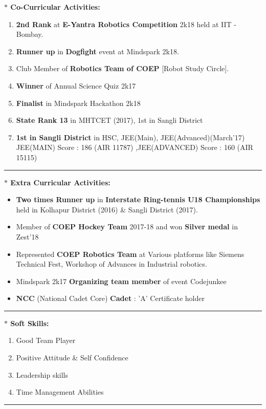 \documentclass[a4paper,11pt]{article} %
\begin{document}
			\begin{LARGE}
				\textbf{\large $\ast$ Co-Curricular Activities:}\smallskip%
				{\small
					\begin{enumerate}%
						\item \textbf{2nd Rank } at \textbf{E-Yantra Robotics Competition} 2k18 held at IIT - Bombay.
						\item \textbf{Runner up} in \textbf{Dogfight} event at Mindspark 2k18.
						\item Club Member of \textbf{Robotics Team of COEP} [Robot Study Circle].
						\item \textbf{Winner} of Annual Science Quiz 2k17
						\item \textbf{Finalist} in Mindspark Hackathon 2k18
						
						\item \textbf{State Rank 13} in MHTCET (2017), 1st in Sangli District
						\item \textbf{1st in Sangli District} in HSC, JEE(Main), JEE(Advanced)(March'17)\newline
						 JEE(MAIN) Score : 186 (AIR 11787) ,JEE(ADVANCED) Score : 160 (AIR 15115)
						
					\end{enumerate}
				}
			\end{LARGE}
\hrule	
\bigskip

			\begin{LARGE}
				\textbf{\large $\ast$ Extra Curricular Activities:}\medskip%
				{\small
					\begin{itemize}
						\item     \textbf{Two times Runner up} in \textbf{Interstate Ring-tennis U18 Championships} held in Kolhapur District (2016) \& Sangli District (2017).
						\item  Member of \textbf{COEP Hockey Team} 2017-18 and won \textbf{Silver medal} in Zest'18
						\item  Represented \textbf{COEP Robotics Team} at Various platforms like
Siemens Technical Fest, Workshop of Advances in Industrial robotics.
						\item Mindspark 2k17 \textbf{Organizing team member} of event Codejunkee
						\item  \textbf{NCC} (National Cadet Core) \textbf{Cadet} : 'A' Certificate holder
					\end{itemize}
				}
				\bigskip
			\end{LARGE}
\hrule	
\bigskip

			\begin{LARGE}
				\textbf{\large $\ast$ Soft Skills:}\smallskip%
				{\small
					\begin{enumerate}%
						
						\item Good Team Player
						\item Positive Attitude \& Self Confidence
						\item Leadership skills
						\item Time Management Abilities
					\end{enumerate}
					\bigskip
				}
			\end{LARGE}
\hrule	
\bigskip
\end{document}
